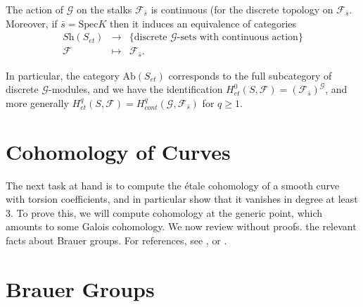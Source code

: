 \begin{theorem}
\label{theorem-equivalence-sheaves-point}
The action of $\mathcal{G}$ on the stalks $\mathcal{F}_{\bar s}$ is continuous 
(for the discrete topology on $\mathcal{F}_{\bar s}$. Moreover, if $\bar s= 
\text{Spec} K$ then it induces an equivalence of categories
$$
\begin{matrix}
\textit{Sh}(S_{et}) & \longrightarrow & \{ \text{discrete $\mathcal{G}$-sets 
with continuous action} \} \\
\mathcal{F} & \longmapsto & \mathcal{F}_{\bar s}.
\end{matrix}
$$
\end{theorem}

\noindent
In particular, the category $\text{Ab}(S_{et})$ corresponds to the full 
subcategory of discrete $\mathcal{G}$-modules, and we have the identification 
$H_{et}^0(S,\mathcal{F}) = (\mathcal{F}_{\bar s})^\mathcal{G}$, and more 
generally $H_{et}^q(S,\mathcal{F}) = H_{cont}^q (\mathcal{G}, \mathcal{F}_{\bar 
s})$ for $q \geq 1$.





\section{Cohomology of Curves}
\label{section-cohomology-curves}

\noindent
The next task at hand is to compute the \'etale cohomology of a smooth curve 
with torsion coefficients, and in particular show that it vanishes in degree at 
least 3. To prove this, we will compute cohomology at the generic point, which 
amounts to some Galois cohomology. We now review without proofs. the relevant 
facts about Brauer groups. For references, see \cite{SerreCorpsLocaux}, 
\cite{SerreGaloisCohomology} or \cite{Weil}.




\section{Brauer Groups}
\label{section-brauer-groups}

